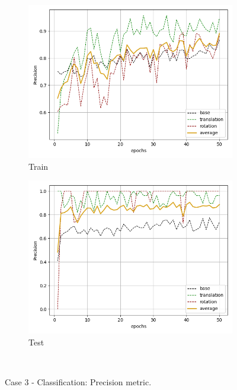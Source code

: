 \begin{figure}[H]
    \begin{subfigure}{.48\linewidth}
    \centering
    \includegraphics[scale=0.45]{Img/cls_flow_nonoise_train_prec.png}
    \caption{Train}
    \end{subfigure}
    \begin{subfigure}{.48\linewidth}
    \centering
    \includegraphics[scale=0.45]{Img/cls_flow_nonoise_test_prec.png}
    \caption{Test}
    \end{subfigure}\\
    \caption{Case 3 - Classification: Precision metric.}
\end{figure}
